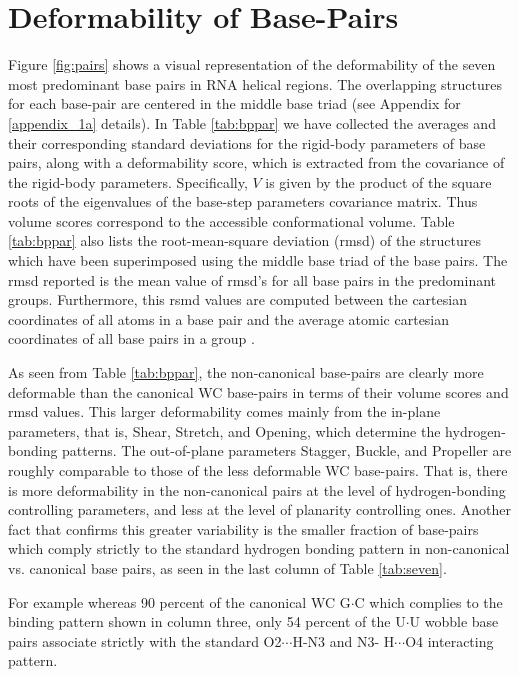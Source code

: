 \section{Deformability of Base-Pairs}
Figure   \ref{fig:pairs}  shows   a  visual   representation   of  the
deformability of the seven most  predominant base pairs in RNA helical
regions. The overlapping structures for each base-pair are centered in
the middle  base triad  (see Appendix for  \ref{appendix_1a} details).
In  Table \ref{tab:bppar}  we have  collected the  averages  and their
corresponding  standard deviations  for the  rigid-body  parameters of
base pairs, along with a  deformability score, which is extracted from
the  covariance  of   the  rigid-body  parameters.  Specifically,  $V$
\cite{olson1998} is  given by the product  of the square  roots of the
eigenvalues  of  the  base-step  parameters covariance  matrix.   Thus
volume   scores   correspond    to   the   accessible   conformational
volume.   Table  \ref{tab:bppar}   also  lists   the  root-mean-square
deviation (rmsd) of the  structures which have been superimposed using
the middle base triad of the base pairs. The rmsd reported is the mean
value  of  rmsd's  for  all  base pairs  in  the  predominant  groups.
Furthermore,  this  rsmd values  are  computed  between the  cartesian
coordinates  of  all atoms  in  a base  pair  and  the average  atomic
cartesian coordinates of all base pairs in a group \cite{eargle2006}.

As seen  from Table \ref{tab:bppar}, the  non-canonical base-pairs are
clearly more deformable  than the canonical WC base-pairs  in terms of
their volume  scores and rmsd values. This  larger deformability comes
mainly  from the  in-plane parameters,  that is,  Shear,  Stretch, and
Opening,   which  determine   the   hydrogen-bonding  patterns.    The
out-of-plane  parameters Stagger,  Buckle, and  Propeller  are roughly
comparable to  those of  the less deformable  WC base-pairs.  That is,
there is more deformability in the non-canonical pairs at the level of
hydrogen-bonding  controlling parameters,  and  less at  the level  of
planarity controlling  ones. Another  fact that confirms  this greater
variability  is  the  smaller  fraction  of  base-pairs  which  comply
strictly to the standard hydrogen bonding pattern in non-canonical vs.
canonical  base   pairs,  as  seen   in  the  last  column   of  Table
\ref{tab:seven}.

For example  whereas 90  percent of the  canonical WC  G$\cdot$C which
complies to the binding pattern  shown in column  three, only 54
percent of the U$\cdot$U wobble base pairs associate strictly with the standard
O2$\cdots$H-N3 and N3- H$\cdots$O4 interacting pattern. 




